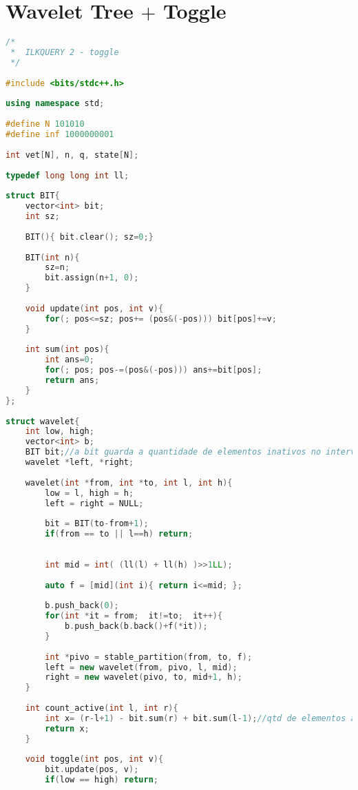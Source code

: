 \documentclass[12pt,a4paper,twoside]{report}
\begin{document}
\section{Wavelet Tree $+$ Toggle}
\noindent\begin{lstlisting}[caption=Wavelet Tree + Toggle,language=C++]
/*
 *  ILKQUERY 2 - toggle
 */
 
#include <bits/stdc++.h>
 
using namespace std;
 
#define N 101010
#define inf 1000000001
 
int vet[N], n, q, state[N];
 
typedef long long int ll;
 
struct BIT{
    vector<int> bit;
    int sz;
     
    BIT(){ bit.clear(); sz=0;}
     
    BIT(int n){
        sz=n;
        bit.assign(n+1, 0);
    }
     
    void update(int pos, int v){
        for(; pos<=sz; pos+= (pos&(-pos))) bit[pos]+=v;
    }
     
    int sum(int pos){
        int ans=0;
        for(; pos; pos-=(pos&(-pos))) ans+=bit[pos];
        return ans;
    }
};
 
struct wavelet{
    int low, high;
    vector<int> b;
    BIT bit;//a bit guarda a quantidade de elementos inativos no intervalo
    wavelet *left, *right;
     
    wavelet(int *from, int *to, int l, int h){
        low = l, high = h;
        left = right = NULL;
         
        bit = BIT(to-from+1);
        if(from == to || l==h) return;
         
         
        int mid = int( (ll(l) + ll(h) )>>1LL);
         
        auto f = [mid](int i){ return i<=mid; };
         
        b.push_back(0);
        for(int *it = from;  it!=to;  it++){
            b.push_back(b.back()+f(*it));
        }
         
        int *pivo = stable_partition(from, to, f);
        left = new wavelet(from, pivo, l, mid);
        right = new wavelet(pivo, to, mid+1, h);
    }
     
    int count_active(int l, int r){
        int x= (r-l+1) - bit.sum(r) + bit.sum(l-1);//qtd de elementos ativos: |range| - qtd inativos no range
        return x;
    }
     
    void toggle(int pos, int v){
        bit.update(pos, v);
        if(low == high) return;
         

\end{lstlisting}
\end{document}
